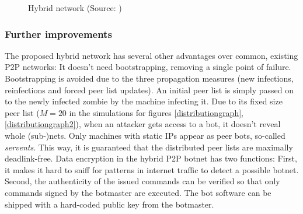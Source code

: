 \documentclass{llncs}
\begin{document}
\begin{figure}[htbp]
  \centering
  \caption{Hybrid network (Source: \cite{td1sc})}
  \label{hybrid-network}
\end{figure}

\subsubsection{Further improvements}
\label{hybridimprovs}
The proposed hybrid network has several other advantages over common,
existing P2P networks: It doesn't need bootstrapping, removing a
single point of failure. Bootstrapping is avoided due to the three
propagation measures (new infections, reinfections and forced peer
list updates). An initial peer list is simply passed on to the newly
infected zombie by the machine infecting it. Due to its fixed size
peer list ($M=20$ in the simulations for figures \ref{distributiongraph},
\ref{distributiongraph2}), when an attacker gets access to a bot, it
doesn't reveal whole (sub-)nets.  Only machines with static IPs appear
as peer bots, so-called {\it servents}. This way, it is guaranteed that
the distributed peer lists are maximally deadlink-free. Data
encryption in the hybrid P2P botnet has two functions: First, it makes
it hard to sniff for patterns in internet traffic to detect a possible
botnet. Second, the authenticity of the issued commands can be
verified so that only commands signed by the botmaster are
executed. The bot software can be shipped with a hard-coded public key
from the botmaster.

\end{document}
